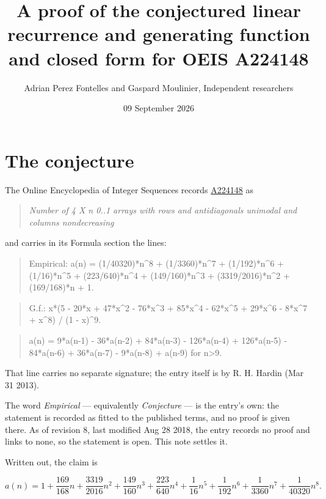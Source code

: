\documentclass[11pt]{article}
\title{A proof of the conjectured linear recurrence and generating function and closed form for OEIS A224148}
\author{Adrian Perez Fontelles and Gaspard Moulinier, Independent researchers}
\date{09 September 2026}
\theoremstyle{definition}
\begin{document}
\maketitle
\section{The conjecture}

The Online Encyclopedia of Integer Sequences records \href{https://oeis.org/A224148}{A224148} as

\begin{quote}\itshape Number of 4 X n 0..1 arrays with rows and antidiagonals unimodal and columns nondecreasing\end{quote}

and carries in its Formula section the lines:

\begin{quote}\ttfamily Empirical: a(n) = (1/40320)*n\textasciicircum{}8 + (1/3360)*n\textasciicircum{}7 + (1/192)*n\textasciicircum{}6 + (1/16)*n\textasciicircum{}5 + (223/640)*n\textasciicircum{}4 + (149/160)*n\textasciicircum{}3 + (3319/2016)*n\textasciicircum{}2 + (169/168)*n + 1.\end{quote}

\begin{quote}\ttfamily G.f.: x*(5 - 20*x + 47*x\textasciicircum{}2 - 76*x\textasciicircum{}3 + 85*x\textasciicircum{}4 - 62*x\textasciicircum{}5 + 29*x\textasciicircum{}6 - 8*x\textasciicircum{}7 + x\textasciicircum{}8) / (1 - x)\textasciicircum{}9.\end{quote}

\begin{quote}\ttfamily a(n) = 9*a(n-1) - 36*a(n-2) + 84*a(n-3) - 126*a(n-4) + 126*a(n-5) - 84*a(n-6) + 36*a(n-7) - 9*a(n-8) + a(n-9) for n>9.\end{quote}

That line carries no separate signature; the entry itself is by R. H. Hardin (Mar 31 2013).

The word {\itshape Empirical} --- equivalently {\itshape Conjecture} --- is the entry's own: the statement is recorded as fitted to the published terms, and no proof is given there. As of revision 8, last modified Aug 28 2018, the entry records no proof and links to none, so the statement is open. This note settles it.

Written out, the claim is

\[a(n) = 1 + \frac{169}{168}n + \frac{3319}{2016}n^{2} + \frac{149}{160}n^{3} + \frac{223}{640}n^{4} + \frac{1}{16}n^{5} + \frac{1}{192}n^{6} + \frac{1}{3360}n^{7} + \frac{1}{40320}n^{8}.\]
\end{document}
